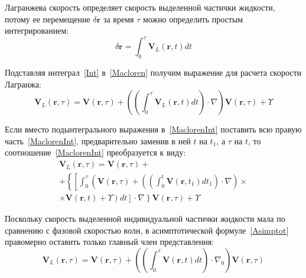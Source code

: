 Лагранжева скорость определяет скорость выделенной частички жидкости, потому ее перемещение  $ \delta \mathbf{r} $ за время $ \tau $ можно определить простым интегрированием:
\begin{equation}
 \delta \mathbf{r} = \int_{0}^{\tau} \mathbf{V}_{L}\left( \mathbf{r},t \right)d t
 \label{Int}
\end{equation}
	 
Подставляя интеграл~\eqref{Int} в~\eqref{Macloren} получим выражение для расчета скорости Лагранжа:
\begin{equation}
\mathbf{V}_{L}\left( \mathbf{r}, \tau\right) = \mathbf{V}\left( \mathbf{r}, \tau \right) + \left( \left( \int_{0}^{\tau} \mathbf{V}_{L}\left( \mathbf{r},t \right)d t\right) \cdot \nabla \right) \mathbf{V}\left( \mathbf{r}, \tau \right) + \Upsilon
\label{MaclorenInt}
\end{equation}

Если вместо подынтегрального выражения в~\eqref{MaclorenInt} поставить всю правую часть~\eqref{MaclorenInt}, предварительно заменив в ней $ t $ на $ t_{1} $, а $ \tau $ на $ t $, то соотношение~\eqref{MaclorenInt} преобразуется к виду:
\begin{multline}
\mathbf{V}_{L}\left( \mathbf{r}, \tau \right) = \mathbf{V}\left( \mathbf{r}, \tau \right) +\\
+ \left\lbrace  \left[ \int_{0}^{\tau}\left( \mathbf{V}\left( \mathbf{r}, \tau \right) +\left( \left( \int_{0}^{t}\mathbf{V}\left( \mathbf{r}, t_{1} \right)d t_{1}\right) \cdot \nabla \right)\times \right. \right. \right. \\
\left. \left. \left. \times \mathbf{V}\left( \mathbf{r}, t \right) + \Upsilon \right) d t \right] \cdot \nabla \right\rbrace  \mathbf{V}\left( \mathbf{r}, \tau \right) +\Upsilon
\label{Asimptot}
\end{multline}
	 
Поскольку скорость выделенной индивидуальной частички жидкости  мала по сравнению с фазовой скоростью волн, в асимптотической формуле~\eqref{Asimptot} правомерно оставить только главный член представления:
\begin{equation}
\mathbf{V}_{L}\left( \mathbf{r}, \tau\right) = \mathbf{V}\left( \mathbf{r}, \tau \right) + \left( \left( \int_{0}^{\tau} \mathbf{V}\left( \mathbf{r},t \right)d t\right) \cdot \nabla_{0} \right) \mathbf{V}\left( \mathbf{r}, \tau \right) 
\label{Pereh}
\end{equation}


